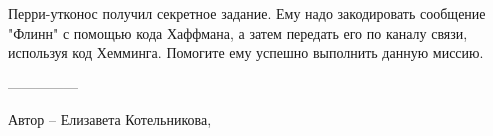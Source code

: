 \question
Перри-утконос получил секретное задание. Ему надо закодировать сообщение "Флинн" с помощью кода Хаффмана, а затем передать его по каналу связи, используя код Хемминга. Помогите ему успешно выполнить данную миссию.

---------------

Автор -- Елизавета Котельникова,
